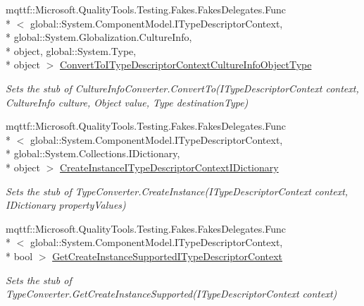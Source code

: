 \begin{DoxyCompactItemize}
mqttf\-::\-Microsoft.\-Quality\-Tools.\-Testing.\-Fakes.\-Fakes\-Delegates.\-Func\\*
$<$ global\-::\-System.\-Component\-Model.\-I\-Type\-Descriptor\-Context, \\*
global\-::\-System.\-Globalization.\-Culture\-Info, \\*
object, global\-::\-System.\-Type, \\*
object $>$ \hyperlink{class_system_1_1_component_model_1_1_fakes_1_1_stub_culture_info_converter_a5f23940c0936fcf7f3637a05d3fe81f8}{Convert\-To\-I\-Type\-Descriptor\-Context\-Culture\-Info\-Object\-Type}
\begin{DoxyCompactList}\small\item\em Sets the stub of Culture\-Info\-Converter.\-Convert\-To(\-I\-Type\-Descriptor\-Context context, Culture\-Info culture, Object value, Type destination\-Type)\end{DoxyCompactList}\item 
mqttf\-::\-Microsoft.\-Quality\-Tools.\-Testing.\-Fakes.\-Fakes\-Delegates.\-Func\\*
$<$ global\-::\-System.\-Component\-Model.\-I\-Type\-Descriptor\-Context, \\*
global\-::\-System.\-Collections.\-I\-Dictionary, \\*
object $>$ \hyperlink{class_system_1_1_component_model_1_1_fakes_1_1_stub_culture_info_converter_a983e9f1c21ce77954cb0b30190deed16}{Create\-Instance\-I\-Type\-Descriptor\-Context\-I\-Dictionary}
\begin{DoxyCompactList}\small\item\em Sets the stub of Type\-Converter.\-Create\-Instance(\-I\-Type\-Descriptor\-Context context, I\-Dictionary property\-Values)\end{DoxyCompactList}\item 
mqttf\-::\-Microsoft.\-Quality\-Tools.\-Testing.\-Fakes.\-Fakes\-Delegates.\-Func\\*
$<$ global\-::\-System.\-Component\-Model.\-I\-Type\-Descriptor\-Context, \\*
bool $>$ \hyperlink{class_system_1_1_component_model_1_1_fakes_1_1_stub_culture_info_converter_a3d60a0bd2444961e1fa2920e4766d816}{Get\-Create\-Instance\-Supported\-I\-Type\-Descriptor\-Context}
\begin{DoxyCompactList}\small\item\em Sets the stub of Type\-Converter.\-Get\-Create\-Instance\-Supported(\-I\-Type\-Descriptor\-Context context)\end{DoxyCompactList}\item 

\end{DoxyCompactItemize}
